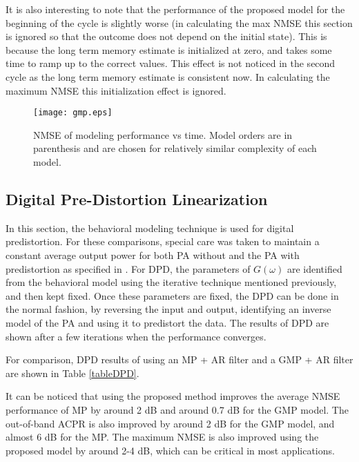 \documentclass[journal]{IEEEtran}
\begin{document}
It is also interesting to note that the performance of the proposed model for the beginning of the cycle is slightly worse (in calculating the max NMSE this section is ignored so that the outcome does not depend on the initial state). This is because the long term memory estimate is initialized at zero, and takes some time to ramp up to the correct values. This effect is not noticed in the second cycle as the long term memory estimate is consistent now. In calculating the maximum NMSE this initialization effect is ignored.
\begin{figure}
\centering
\texttt{[image: gmp.eps]}
\caption{NMSE of modeling performance vs time. Model orders are in parenthesis and are chosen for relatively similar complexity of each model.} \label{NMSE_performance}
\end{figure}

\subsection{Digital Pre-Distortion Linearization}
In this section, the behavioral modeling technique is used for digital predistortion. For these comparisons, special care was taken to maintain a constant average output power for both PA without and the PA with predistortion as specified in \cite{zhudpd}. For DPD, the parameters of $G(\omega)$ are identified from the behavioral model using the iterative technique mentioned previously, and then kept fixed. Once these parameters are fixed, the DPD can be done in the normal fashion, by reversing the input and output, identifying an inverse model of the PA and using it to predistort the data. The results of DPD are shown after a few iterations when the performance converges.

For comparison, DPD results of using an MP + AR filter and a GMP + AR filter are shown in Table \ref{tableDPD}.
\begin{table}
\caption{Comparison of DPD for the proposed modeling technique and MP and GMP. Model orders (in parenthesis) are chosen for relative similar complexity.} 
\end{table}
It can be noticed that using the proposed method improves the average NMSE performance of MP by around 2 dB and around 0.7 dB for the GMP model. The out-of-band ACPR is also improved by around 2 dB for the GMP model, and almost 6 dB for the MP. The maximum NMSE is also improved using the proposed model by around 2-4 dB, which can be critical in most applications.
\end{document}
